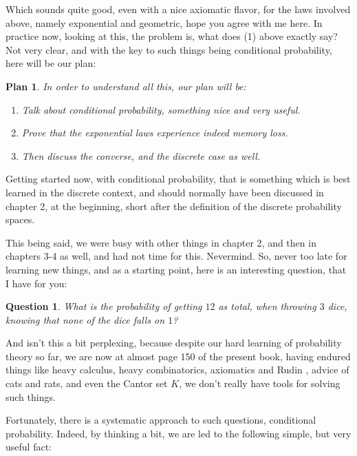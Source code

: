 \documentclass[12pt]{amsbook}
\newtheorem{plan}[theorem]{Plan}
\newtheorem{question}[theorem]{Question}
\begin{document}
Which sounds quite good, even with a nice axiomatic flavor, for the laws involved above, namely exponential and geometric, hope you agree with me here. In practice now, looking at this, the problem is, what does (1) above exactly say? Not very clear, and with the key to such things being conditional probability, here will be our plan:

\begin{plan}
In order to understand all this, our plan will be:
\begin{enumerate}
\item Talk about conditional probability, something nice and very useful.

\item Prove that the exponential laws experience indeed memory loss.

\item Then discuss the converse, and the discrete case as well.
\end{enumerate}
\end{plan}

Getting started now, with conditional probability, that is something which is best learned in the discrete context, and should normally have been discussed in chapter 2, at the beginning, short after the definition of the discrete probability spaces.

\bigskip

This being said, we were busy with other things in chapter 2, and then in chapters 3-4 as well, and had not time for this. Nevermind. So, never too late for learning new things, and as a starting point, here is an interesting question, that I have for you:

\begin{question}
What is the probability of getting $12$ as total, when throwing $3$ dice, knowing that none of the dice falls on $1$?
\end{question}

And isn't this a bit perplexing, because despite our hard learning of probability theory so far, we are now at almost page 150 of the present book, having endured things like heavy calculus, heavy combinatorics, axiomatics and Rudin \cite{rud}, advice of cats and rats, and even the Cantor set $K$, we don't really have tools for solving such things.

\bigskip

Fortunately, there is a systematic approach to such questions, conditional probability. Indeed, by thinking a bit, we are led to the following simple, but very useful fact:
\end{document}
